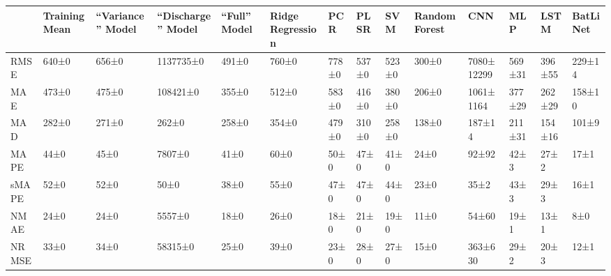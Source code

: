 \begin{tabular}{llllllllllllll}
\toprule
 & Training Mean & ``Variance'' Model & ``Discharge'' Model & ``Full'' Model & Ridge Regression & PCR & PLSR & SVM & Random Forest & CNN & MLP & LSTM & BatLiNet \\
\midrule
RMSE & 640±0 & 656±0 & 1137735±0 & 491±0 & 760±0 & 778±0 & 537±0 & 523±0 & 300±0 & 7080±12299 & 569±31 & 396±55 & 229±14 \\
MAE & 473±0 & 475±0 & 108421±0 & 355±0 & 512±0 & 583±0 & 416±0 & 380±0 & 206±0 & 1061±1164 & 377±29 & 262±29 & 158±10 \\
MAD & 282±0 & 271±0 & 262±0 & 258±0 & 354±0 & 479±0 & 310±0 & 258±0 & 138±0 & 187±14 & 211±31 & 154±16 & 101±9 \\
MAPE & 44±0 & 45±0 & 7807±0 & 41±0 & 60±0 & 50±0 & 47±0 & 41±0 & 24±0 & 92±92 & 42±3 & 27±2 & 17±1 \\
sMAPE & 52±0 & 52±0 & 50±0 & 38±0 & 55±0 & 47±0 & 47±0 & 44±0 & 23±0 & 35±2 & 43±3 & 29±3 & 16±1 \\
NMAE & 24±0 & 24±0 & 5557±0 & 18±0 & 26±0 & 18±0 & 21±0 & 19±0 & 11±0 & 54±60 & 19±1 & 13±1 & 8±0 \\
NRMSE & 33±0 & 34±0 & 58315±0 & 25±0 & 39±0 & 23±0 & 28±0 & 27±0 & 15±0 & 363±630 & 29±2 & 20±3 & 12±1 \\
\bottomrule
\end{tabular}

